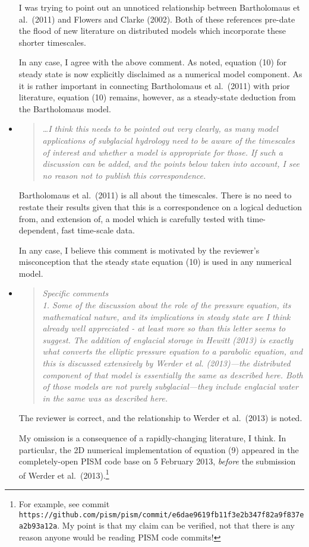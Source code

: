 \documentclass[11pt,reqno]{amsart}
\newcommand{\reply}[2]{
\medskip\medskip
\item  \begin{quote}
\emph{#1}
\end{quote}

\medskip
\noindent #2}
\begin{document}
\begin{itemize}
{I was trying to point out an unnoticed relationship between Bartholomaus et al.~(2011) and Flowers and Clarke (2002).  Both of these references pre-date the flood of new literature on distributed models which incorporate these shorter timescales.

In any case, I agree with the above comment.  As noted, equation (10) for steady state is now explicitly disclaimed as a numerical model component.  As it is rather important in connecting Bartholomaus et al.~(2011) with prior literature, equation (10) remains, however, as a steady-state deduction from the Bartholomaus model.}

\reply{\dots I think this needs to be pointed out very clearly, as many model applications of subglacial hydrology need to be aware of the timescales of interest and whether a model is appropriate for those. If such a discussion can be added, and the points below taken into account, I see no reason not to publish this correspondence.}
{Bartholomaus et al.~(2011) is all about the timescales.  There is no need to restate their results given that this is a correspondence on a logical deduction from, and extension of, a model which is carefully tested with time-dependent, fast time-scale data.

In any case, I believe this comment is motivated by the reviewer's misconception that the steady state equation (10) is used in any numerical model.}

\reply{Specific comments \smallskip \\
1. Some of the discussion about the role of the pressure equation, its mathematical nature, and its implications in steady state are I think already well appreciated - at least more so than this letter seems to suggest. The addition of englacial storage in Hewitt (2013) is exactly what converts the elliptic pressure equation to a parabolic equation, and this is discussed extensively by Werder et al. (2013)---the distributed component of that model is essentially the same as described here.  Both of those models are not purely subglacial---they include englacial water in the same was as described here.}
{The reviewer is correct, and the relationship to Werder et al.~(2013) is noted.

My omission is a consequence of a rapidly-changing literature, I think.  In particular, the 2D numerical implementation of equation (9) appeared in the completely-open PISM code base on 5 February 2013, \emph{before} the submission of Werder et al.~(2013).\footnote{For example, see commit \texttt{https://github.com/pism/pism/commit/e6dae9619fb11f3e2b347f82a9f837ea2b93a12a}.  My point is that my claim can be verified, not that there is any reason anyone would be reading PISM code commits!}

}
\end{itemize}
\end{document}
